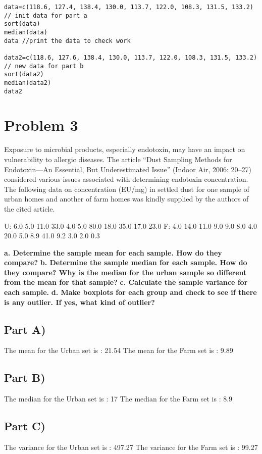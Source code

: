 \documentclass[11pt]{article}
\begin{document}
\begin{verbatim}
data=c(118.6, 127.4, 138.4, 130.0, 113.7, 122.0, 108.3, 131.5, 133.2)
// init data for part a
sort(data)
median(data)
data //print the data to check work

data2=c(118.6, 127.6, 138.4, 130.0, 113.7, 122.0, 108.3, 131.5, 133.2)
// new data for part b
sort(data2)
median(data2)
data2
\end{verbatim}

\section{Problem 3}
\label{sec:orgfb90866}
Exposure to microbial products, especially endotoxin, may have an impact on vulnerability to allergic diseases. The article “Dust Sampling Methods for Endotoxin—An Essential, But Underestimated Issue” (Indoor Air, 2006: 20–27) considered various issues associated with determining endotoxin concentration. The following data on concentration (EU/mg) in settled dust for one sample of urban homes and another of farm homes was kindly supplied by the authors of the cited article.

U: 6.0 5.0 11.0 33.0 4.0 5.0 80.0 18.0 35.0 17.0 23.0
F: 4.0 14.0 11.0 9.0 9.0 8.0 4.0 20.0 5.0 8.9 41.0 9.2 3.0 2.0 0.3

\textbf{a. Determine the sample mean for each sample. How do they compare?}
\textbf{b. Determine the sample median for each sample. How do they compare? Why is the median for the urban sample so different from the mean for that sample?}
\textbf{c. Calculate the sample variance for each sample.}
\textbf{d. Make boxplots for each group and check to see if there is any outlier. If yes, what kind of outlier?}

\subsection{Part A)}
\label{sec:org07fd9bd}
The mean for the Urban set is : 21.54
The mean for the Farm  set is : 9.89

\subsection{Part B)}
\label{sec:org5f9c7b3}
The median for the Urban set is : 17
The median for the Farm  set is : 8.9

\subsection{Part C)}
\label{sec:org12d672f}
The variance for the Urban set is : 497.27
The variance for the Farm  set is : 99.27
\end{document}
